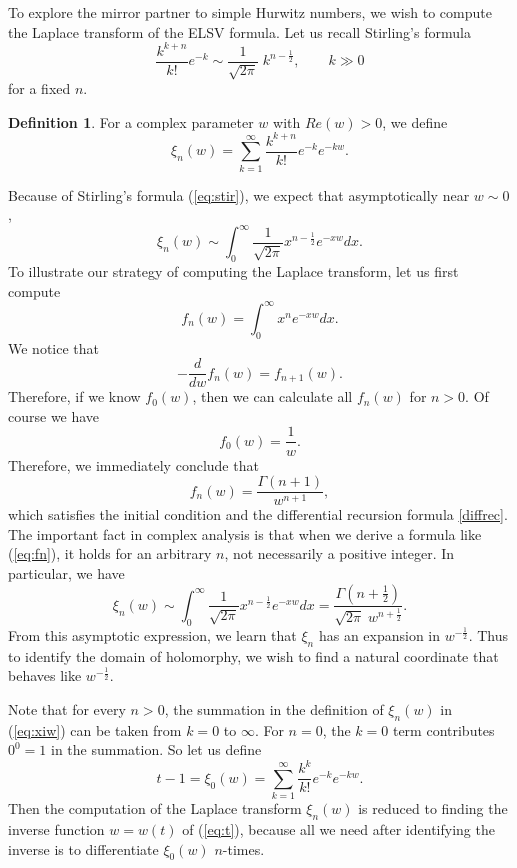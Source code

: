 \documentclass{amsart}
\theoremstyle{definition}
\newtheorem{Def}[thm]{Definition}
\numberwithin{equation}{section}
\numberwithin{figure}{section}
\newcommand{\be}{\begin{equation}}
\newcommand{\ee}{\end{equation}}
\newcommand{\half}{{\frac{1}{2}}}
\begin{document}
To explore the mirror partner to simple
Hurwitz numbers, we wish to compute the 
Laplace transform of the ELSV formula. 
Let us recall Stirling's formula
\begin{equation}
\label{eq:stir}
\frac{k ^{k+n}}{k!} e^{-k}\sim
\frac{1}{\sqrt{2\pi}} \; k ^{n-\half},\qquad k\gg0
\end{equation}
for a fixed $n$.
\begin{Def}
For a complex parameter $w$ with $Re(w)>0$,
we define
\begin{equation}
\label{eq:xiw}
\xi_n(w) = \sum_{k=1} ^\infty 
\frac{k ^{k+n}}{k!} e^{-k} e^{-kw}.
\end{equation}
\end{Def}
Because of Stirling's formula (\ref{eq:stir}), we expect 
that asymptotically near $w\sim 0$, 
$$
\xi_n(w) \sim \int_0 ^\infty \frac{1}{\sqrt{2\pi}}
 x^{n-\half}e^{-xw}dx.
$$
To illustrate our strategy of computing the 
Laplace transform, let us first compute
$$
f_n(w) = \int_0 ^\infty x^n e^{-xw}dx.
$$
We notice that 
\be
\label{diffrec}
-\frac{d}{dw}f_n(w) = f_{n+1}(w). 
\ee
Therefore, if we know $f_0(w)$, then we can
calculate all $f_n(w)$ for $n>0$. 
Of course we have
$$
f_0(w) =\frac{1}{w}.
$$
Therefore, we immediately conclude that
\begin{equation}
\label{eq:fn}
f_n(w) = \frac{\Gamma(n+1)}{w^{n+1}},
\end{equation}
which satisfies the initial condition and the
differential recursion formula \eqref{diffrec}.
The important fact in complex analysis is that
when we derive a formula like (\ref{eq:fn}),
it holds for an arbitrary $n$, not necessarily a positive integer. In particular,
we have
$$
\xi_n(w) \sim \int_0 ^\infty \frac{1}{\sqrt{2\pi}}
 x^{n-\half}e^{-xw}dx = 
 \frac{\Gamma(n+\half)}{\sqrt{2\pi} \;w^{n+\half}}.
$$
From this asymptotic expression, we learn that
$\xi_n$ has an expansion in
$w^{-\half}$. Thus to identify the domain of 
holomorphy, we wish to find a natural coordinate
that behaves like $w^{-\half}$.



Note that for every $n>0$, the  summation in the definition 
of $\xi_n(w)$ in (\ref{eq:xiw}) can be
taken from $k=0$ to $\infty$. For $n=0$, the $k=0$
term contributes $0^0=1$ in the summation. So let us define
\begin{equation}
\label{eq:t}
t-1 = \xi_0(w) = \sum_{k=1} ^\infty
\frac{k^k}{k!}e^{-k}e^{-kw}.
\end{equation}
Then the computation of the Laplace transform
$\xi_n(w)$ is reduced to finding the 
inverse function $w = w(t)$ of (\ref{eq:t}),
because all we need after identifying the inverse is
to differentiate $\xi_0(w)$ $n$-times. 
\end{document}

